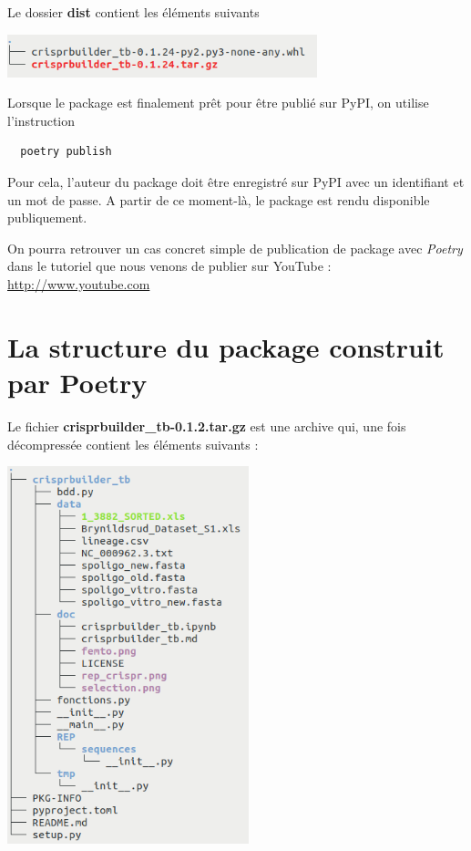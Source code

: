 \documentclass[twoside,a4paper,11pt,frenchb,openany]{report}
\begin{document}
Le dossier \textbf{dist} contient les éléments suivants

\includegraphics[width=9cm]{rep_dist.png}



Lorsque le package est finalement prêt pour être publié sur PyPI, on utilise l’instruction
\begin{verbatim}  poetry publish\end{verbatim}
Pour cela, l'auteur du package doit être enregistré sur PyPI avec un identifiant et un mot de passe. A partir de ce moment-là, le package est rendu disponible publiquement.

On pourra retrouver un cas concret simple de publication de package avec \textit{Poetry} dans le tutoriel que nous venons de publier sur YouTube : \href{http://www.youtube.com}{http://www.youtube.com}





\section{La structure du package construit par Poetry}

Le fichier \textbf{crisprbuilder\_tb-0.1.2.tar.gz} est une archive qui, une fois décompressée contient les éléments suivants :

\includegraphics[width=7cm]{tar.png}
\end{document}
